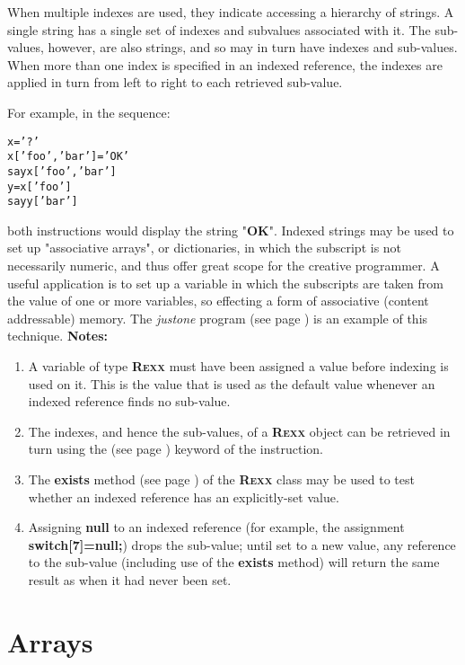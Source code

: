 When multiple indexes are used, they indicate accessing a hierarchy of
strings.  A single \nr{} string has a single set of indexes and
subvalues associated with it.  The sub-values, however, are also \nr{}
strings, and so may in turn have indexes and sub-values.  When more than
one index is specified in an indexed reference, the indexes are applied
in turn from left to right to each retrieved sub-value.
 
For example, in the sequence:
\begin{alltt}
x='?'
x['foo', 'bar']='OK'
say x['foo', 'bar']
y=x['foo']
say y['bar']
\end{alltt}
both  instructions would display the string
"\textbf{OK}".
 Indexed strings may be used to set up "associative arrays", or
dictionaries, in which the subscript is not necessarily numeric, and
thus offer great scope for the creative programmer.
A useful application is to set up a variable in which the subscripts
are taken from the value of one or more variables, so effecting a form
of associative (content addressable) memory.
The  \emph{justone} program (see page \pageref{refjust1})  is an example of this
technique.
 \textbf{Notes:}
\begin{enumerate}
\item 
A variable of type \textbf{R\textsc{exx}} must have been assigned a value
before indexing is used on it.
This is the value that is used as the default value whenever an indexed
reference finds no sub-value.
\item 
The indexes, and hence the sub-values, of a \textbf{R\textsc{exx}} object can
be retrieved in turn using the   (see page \pageref{refloopov})  keyword
of the  instruction.
\item 
The  \textbf{exists} method (see page \pageref{refexists})  of the \textbf{R\textsc{exx}}
class may be used to test whether an indexed reference has an
explicitly-set value.
\item 
Assigning \textbf{null} to an indexed reference (for example, the
assignment \textbf{switch[7]=null;}) drops the sub-value;
until set to a new value, any reference to the sub-value (including use
of the \textbf{exists} method) will return the same result as
when it had never been set.
\end{enumerate}
\section{Arrays}\label{refarray}
 
